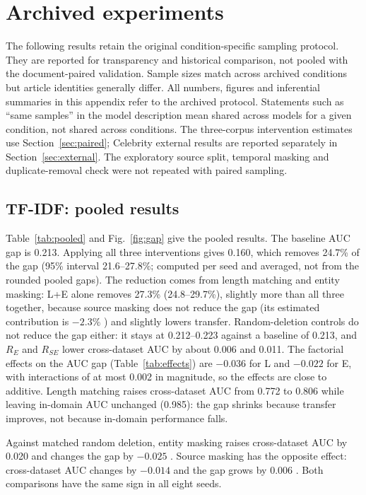 \FloatBarrier
\section{Archived experiments}\label{sec:archived}
The following results retain the original condition-specific sampling protocol. They are reported for transparency and historical comparison, not pooled with the document-paired validation. Sample sizes match across archived conditions but article identities generally differ. All numbers, figures and inferential summaries in this appendix refer to the archived protocol. Statements such as ``same samples'' in the model description mean shared across models for a given condition, not shared across conditions. The three-corpus intervention estimates use Section~\ref{sec:paired}; Celebrity external results are reported separately in Section~\ref{sec:external}. The exploratory source split, temporal masking and duplicate-removal check were not repeated with paired sampling.

\subsection{TF-IDF: pooled results}
Table~\ref{tab:pooled} and Fig.~\ref{fig:gap} give the pooled results. The baseline AUC gap is 0.213. Applying all three interventions gives 0.160, which removes 24.7\% of the gap (95\% interval 21.6--27.8\%; computed per seed and averaged, not from the rounded pooled gaps). The reduction comes from length matching and entity masking: L+E alone removes 27.3\% (24.8--29.7\%), slightly more than all three together, because source masking does not reduce the gap (its estimated contribution is $-2.3\%$ ) and slightly lowers transfer. Random-deletion controls do not reduce the gap either: it stays at 0.212--0.223 against a baseline of 0.213, and $R_E$ and $R_{SE}$ lower cross-dataset AUC by about 0.006 and 0.011. The factorial effects on the AUC gap (Table~\ref{tab:effects}) are $-0.036$ for L and $-0.022$ for E, with interactions of at most 0.002 in magnitude, so the effects are close to additive. Length matching raises cross-dataset AUC from 0.772 to 0.806 while leaving in-domain AUC unchanged (0.985): the gap shrinks because transfer improves, not because in-domain performance falls.

Against matched random deletion, entity masking raises cross-dataset AUC by 0.020  and changes the gap by $-0.025$ . Source masking has the opposite effect: cross-dataset AUC changes by $-0.014$  and the gap grows by 0.006 . Both comparisons have the same sign in all eight seeds.

